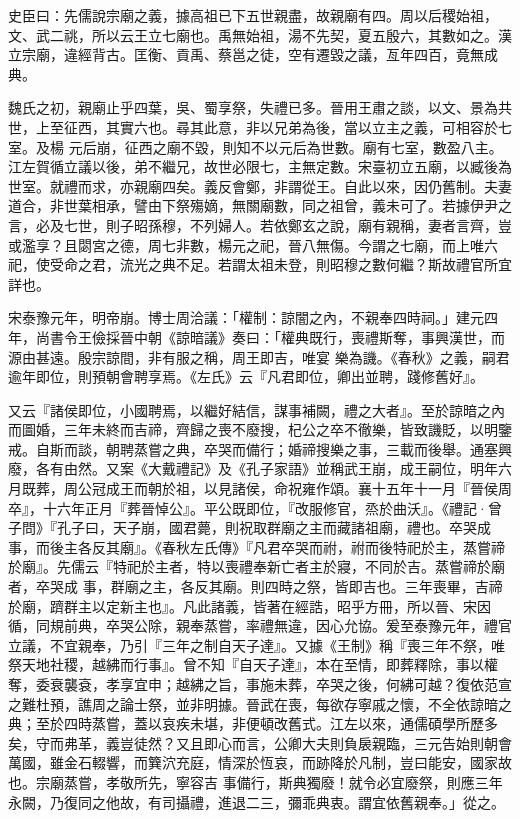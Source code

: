 \begin{pinyinscope}
 史臣曰：先儒說宗廟之義，據高祖已下五世親盡，故親廟有四。周以后稷始祖，文、武二祧，所以云王立七廟也。禹無始祖，湯不先契，夏五殷六，其數如之。漢立宗廟，違經背古。匡衡、貢禹、蔡邕之徒，空有遷毀之議，亙年四百，竟無成典。



 魏氏之初，親廟止乎四葉，吳、蜀享祭，失禮已多。晉用王肅之談，以文、景為共世，上至征西，其實六也。尋其此意，非以兄弟為後，當以立主之義，可相容於七室。及楊
 元后崩，征西之廟不毀，則知不以元后為世數。廟有七室，數盈八主。江左賀循立議以後，弟不繼兄，故世必限七，主無定數。宋臺初立五廟，以臧後為世室。就禮而求，亦親廟四矣。義反會鄭，非謂從王。自此以來，因仍舊制。夫妻道合，非世葉相承，譬由下祭殤嫡，無關廟數，同之祖曾，義未可了。若據伊尹之言，必及七世，則子昭孫穆，不列婦人。若依鄭玄之說，廟有親稱，妻者言齊，豈或濫享？且閟宮之德，周七非數，楊元之祀，晉八無傷。今謂之七廟，而上唯六祀，使受命之君，流光之典不足。若謂太祖未登，則昭穆之數何繼？斯故禮官所宜詳也。



 宋泰豫元年，明帝崩。博士周洽議：「權制：諒闇之內，不親奉四時祠。」建元四年，尚書令王儉採晉中朝《諒暗議》奏曰：「權典既行，喪禮斯奪，事興漢世，而源由甚遠。殷宗諒間，非有服之稱，周王即吉，唯宴
 樂為譏。《春秋》之義，嗣君逾年即位，則預朝會聘享焉。《左氏》云『凡君即位，卿出並聘，踐修舊好』。



 又云『諸侯即位，小國聘焉，以繼好結信，謀事補闕，禮之大者』。至於諒暗之內而圖婚，三年未終而吉禘，齊歸之喪不廢搜，杞公之卒不徹樂，皆致譏貶，以明鑒戒。自斯而談，朝聘蒸嘗之典，卒哭而備行；婚禘搜樂之事，三載而後舉。通塞興廢，各有由然。又案《大戴禮記》及《孔子家語》並稱武王崩，成王嗣位，明年六月既葬，周公冠成王而朝於祖，以見諸侯，命祝雍作頌。襄十五年十一月『晉侯周卒』，十六年正月『葬晉悼公』。平公既即位，『改服修官，烝於曲沃』。《禮記·曾子問》『孔子曰，天子崩，國君薨，則祝取群廟之主而藏諸祖廟，禮也。卒哭成事，而後主各反其廟』。《春秋左氏傳》『凡君卒哭而祔，祔而後特祀於主，蒸嘗禘於廟』。先儒云『特祀於主者，特以喪禮奉新亡者主於寢，不同於吉。蒸嘗禘於廟者，卒哭成
 事，群廟之主，各反其廟。則四時之祭，皆即吉也。三年喪畢，吉禘於廟，躋群主以定新主也』。凡此諸義，皆著在經誥，昭乎方冊，所以晉、宋因循，同規前典，卒哭公除，親奉蒸嘗，率禮無違，因心允協。爰至泰豫元年，禮官立議，不宜親奉，乃引『三年之制自天子達』。又據《王制》稱『喪三年不祭，唯祭天地社稷，越紼而行事』。曾不知『自天子達』，本在至情，即葬釋除，事以權奪，委衰襲袞，孝享宜申；越紼之旨，事施未葬，卒哭之後，何紼可越？復依范宣之難杜預，譙周之論士祭，並非明據。晉武在喪，每欲存寧戚之懷，不全依諒暗之典；至於四時蒸嘗，蓋以哀疾未堪，非便頓改舊式。江左以來，通儒碩學所歷多矣，守而弗革，義豈徒然？又且即心而言，公卿大夫則負扆親臨，三元告始則朝會萬國，雖金石輟響，而簨泬充庭，情深於恆哀，而跡降於凡制，豈曰能安，國家故也。宗廟蒸嘗，孝敬所先，寧容吉
 事備行，斯典獨廢！就令必宜廢祭，則應三年永闕，乃復同之他故，有司攝禮，進退二三，彌乖典衷。謂宜依舊親奉。」從之。




\end{pinyinscope}
